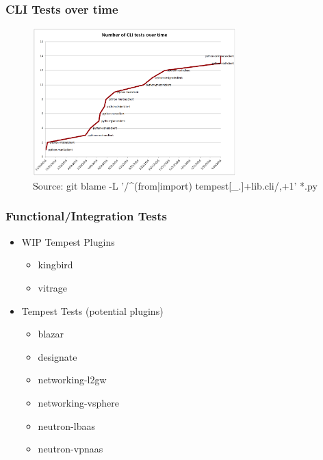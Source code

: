 \documentclass[aspectratio=169,11pt,hyperref={colorlinks=true}]{beamer}
\begin{document}
\begin{frame}
    \frametitle{CLI Tests over time}
    \begin{figure}[p]
    	\centering
    	\includegraphics[width=0.7\textwidth]{cli-tests.png}
        \caption{Source: git blame -L '/\^{}(from|import) tempest[\_.]+lib.cli/,+1' *.py}
    \end{figure}
\end{frame}

\begin{frame}
    \frametitle{Functional/Integration Tests}
    \begin{itemize}
        \item{WIP Tempest Plugins}
            \begin{itemize}
                \item{kingbird}
                \item{vitrage}
            \end{itemize}
    \end{itemize}
    \begin{itemize}
        \item{Tempest Tests (potential plugins)}
            \begin{itemize}
                \item{blazar}
                \item{designate}
                \item{networking-l2gw}
                \item{networking-vsphere}
                \item{neutron-lbaas}
                \item{neutron-vpnaas}
            \end{itemize}
    \end{itemize}
\end{frame}
\end{document}
